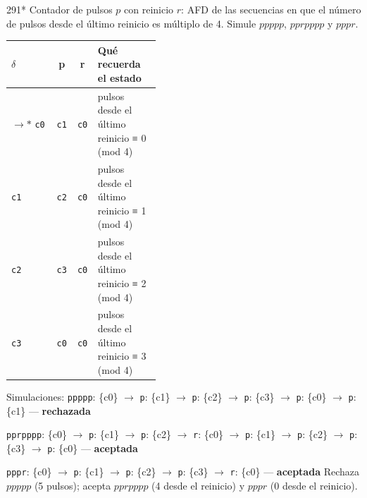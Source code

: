 \documentclass[11pt]{article}
\begin{document}
\begin{ejercicio}{291}{*}
Contador de pulsos $p$ con reinicio $r$: AFD de las secuencias en que el número de pulsos desde el último reinicio es múltiplo de 4. Simule $ppppp$, $pprpppp$ y $pppr$.
\end{ejercicio}
\proc \begin{center}\small\begin{tabular}{lccp{0.42\linewidth}}\toprule
$\delta$ & p & r & Qué recuerda el estado \\\midrule
$\to$$*$ \texttt{c0} & \texttt{c1} & \texttt{c0} & pulsos desde el último reinicio ≡ 0 (mod 4) \\
 \texttt{c1} & \texttt{c2} & \texttt{c0} & pulsos desde el último reinicio ≡ 1 (mod 4) \\
 \texttt{c2} & \texttt{c3} & \texttt{c0} & pulsos desde el último reinicio ≡ 2 (mod 4) \\
 \texttt{c3} & \texttt{c0} & \texttt{c0} & pulsos desde el último reinicio ≡ 3 (mod 4) \\
\bottomrule\end{tabular}\end{center}
Simulaciones: \texttt{ppppp}: \{c0\} $\to$ \texttt{p}: \{c1\} $\to$ \texttt{p}: \{c2\} $\to$ \texttt{p}: \{c3\} $\to$ \texttt{p}: \{c0\} $\to$ \texttt{p}: \{c1\} — \textbf{rechazada}\par \texttt{pprpppp}: \{c0\} $\to$ \texttt{p}: \{c1\} $\to$ \texttt{p}: \{c2\} $\to$ \texttt{r}: \{c0\} $\to$ \texttt{p}: \{c1\} $\to$ \texttt{p}: \{c2\} $\to$ \texttt{p}: \{c3\} $\to$ \texttt{p}: \{c0\} — \textbf{aceptada}\par \texttt{pppr}: \{c0\} $\to$ \texttt{p}: \{c1\} $\to$ \texttt{p}: \{c2\} $\to$ \texttt{p}: \{c3\} $\to$ \texttt{r}: \{c0\} — \textbf{aceptada}
\resp Rechaza $ppppp$ (5 pulsos); acepta $pprpppp$ (4 desde el reinicio) y $pppr$ (0 desde el reinicio).
\end{document}
